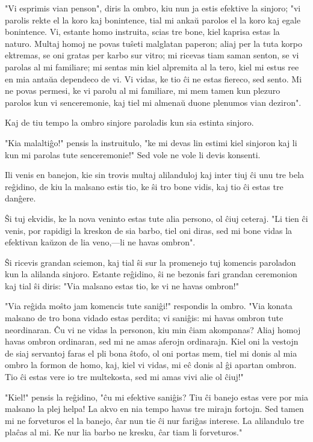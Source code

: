 \documentclass[ngerman,12pt,twoside]{book}
\begin{document}
"Vi esprimis vian penson", diris la ombro, kiu nun ja estis efektive la sinjoro; "vi parolis rekte el la koro kaj bonintence, tial mi ankaŭ parolos el la koro kaj egale bonintence. Vi, estante homo instruita, scias tre bone, kiel kaprisa estas la naturo. Multaj homoj ne povas tuŝeti malglatan paperon; aliaj per la tuta korpo ektremas, se oni gratas per karbo sur vitro; mi ricevas tiam saman senton, se vi parolas al mi familiare; mi sentas min kiel alpremita al la tero, kiel mi estus ree en mia antaŭa dependeco de vi. Vi vidas, ke tio ĉi ne estas fiereco, sed sento. Mi ne povas permesi, ke vi parolu al mi familiare, mi mem tamen kun plezuro parolos kun vi senceremonie, kaj tiel mi almenaŭ duone plenumos vian deziron".

Kaj de tiu tempo la ombro sinjore paroladis kun sia estinta sinjoro.

"Kia malaltiĝo!" pensis la instruitulo, "ke mi devas lin estimi kiel sinjoron kaj li kun mi parolas tute senceremonie!" Sed vole ne vole li devis konsenti.

Ili venis en banejon, kie sin trovis multaj alilanduloj kaj inter tiuj ĉi unu tre bela reĝidino, de kiu la malsano estis tio, ke ŝi tro bone vidis, kaj tio ĉi estas tre danĝere.

Ŝi tuj ekvidis, ke la nova veninto estas tute alia persono, ol ĉiuj ceteraj. "Li tien ĉi venis, por rapidigi la kreskon de sia barbo, tiel oni diras, sed mi bone vidas la efektivan kaŭzon de lia veno,---li ne havas ombron".

Ŝi ricevis grandan sciemon, kaj tial ŝi sur la promenejo tuj komencis paroladon kun la alilanda sinjoro. Estante reĝidino, ŝi ne bezonis fari grandan ceremonion kaj tial ŝi diris: "Via malsano estas tio, ke vi ne havas ombron!"

"Via reĝida moŝto jam komencis tute saniĝi!" respondis la ombro. "Via konata malsano de tro bona vidado estas perdita; vi saniĝis: mi havas ombron tute neordinaran. Ĉu vi ne vidas la personon, kiu min ĉiam akompanas? Aliaj homoj havas ombron ordinaran, sed mi ne amas aferojn ordinarajn. Kiel oni la vestojn de siaj servantoj faras el pli bona ŝtofo, ol oni portas mem, tiel mi donis al mia ombro la formon de homo, kaj, kiel vi vidas, mi eĉ donis al ĝi apartan ombron. Tio ĉi estas vere io tre multekosta, sed mi amas vivi alie ol ĉiuj!"

"Kiel!" pensis la reĝidino, "ĉu mi efektive saniĝis? Tiu ĉi banejo estas vere por mia malsano la plej helpa! La akvo en nia tempo havas tre mirajn fortojn. Sed tamen mi ne forveturos el la banejo, ĉar nun tie ĉi nur fariĝas interese. La alilandulo tre plaĉas al mi. Ke nur lia barbo ne kresku, ĉar tiam li forveturos."
\end{document}
